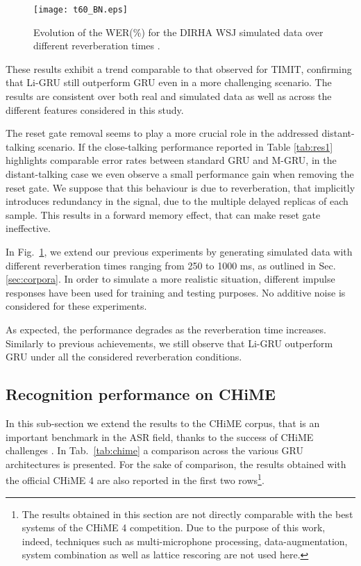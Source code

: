 \documentclass[journal]{IEEEtran}
\begin{document}
\begin{figure}[t]
\centering
  \texttt{[image: t60\_BN.eps]}
\caption{Evolution of the WER(\%) for the DIRHA WSJ simulated data over different reverberation times . }\label{fig:t60}
\end{figure}
These results exhibit a trend comparable to that observed for TIMIT, confirming that Li-GRU still outperform GRU even in a more challenging scenario. The results are consistent over both real and simulated data as well as across the different features considered in this study.

The reset gate removal seems to play a more crucial role in the addressed distant-talking scenario.  If the close-talking performance reported in Table \ref{tab:res1} highlights comparable error rates between standard GRU and M-GRU, in the distant-talking case we even observe a  small performance gain when removing the reset gate. We suppose that this behaviour is due to reverberation, that implicitly introduces redundancy in the signal, due to the multiple delayed replicas of each sample. This results in a forward memory effect, that can make reset gate ineffective. 

In Fig.~\ref{fig:t60}, we extend our previous experiments by generating simulated data with different reverberation times  ranging from 250 to 1000 ms, as outlined in Sec. \ref{sec:corpora}. In order to simulate a more realistic situation, different impulse responses have been used for training and testing purposes. No additive noise is considered for these experiments.

As expected, the performance degrades as the reverberation time increases. Similarly to previous achievements, we still observe that Li-GRU outperform GRU under all the considered reverberation conditions. 

\subsection{Recognition performance on CHiME} \label{sec:chime}
In this sub-section we extend the results to the CHiME corpus, that is an important benchmark in the ASR field, thanks to the success of CHiME challenges \cite{chime,chime3}. In Tab.~\ref{tab:chime} a comparison across the various GRU architectures is presented. For the sake of comparison, the results obtained with the official CHiME 4 are also reported in the first two rows\footnote{The results obtained in this section are not directly comparable with the best systems of the CHiME 4 competition. Due to the purpose of this work, indeed, techniques such as multi-microphone processing, data-augmentation, system combination as well as lattice rescoring are not used here.}. 
\end{document}
